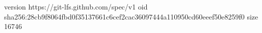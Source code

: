 version https://git-lfs.github.com/spec/v1
oid sha256:28cb9f8064fbd0f35137661c6cef2cac36097444a110950cd60eeef50e8259f0
size 16746
